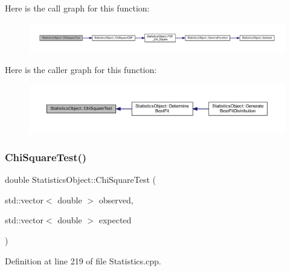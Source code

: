 Here is the call graph for this function\+:
\nopagebreak
\begin{figure}[H]
\begin{center}
\leavevmode
\includegraphics[width=350pt]{class_statistics_object_a5f516a6f544714694efc0ba0f925f38c_cgraph}
\end{center}
\end{figure}
Here is the caller graph for this function\+:
\nopagebreak
\begin{figure}[H]
\begin{center}
\leavevmode
\includegraphics[width=350pt]{class_statistics_object_a5f516a6f544714694efc0ba0f925f38c_icgraph}
\end{center}
\end{figure}
\mbox{\label{class_statistics_object_a6b3b58d412c68407195df629e2343c6d}} 
\subsubsection{\texorpdfstring{Chi\+Square\+Test()}{ChiSquareTest()}\hspace{0.1cm}{\footnotesize\ttfamily [2/2]}}
{\footnotesize\ttfamily double Statistics\+Object\+::\+Chi\+Square\+Test (\begin{DoxyParamCaption}\item[{std\+::vector$<$ double $>$}]{observed,  }\item[{std\+::vector$<$ double $>$}]{expected }\end{DoxyParamCaption})}



Definition at line 219 of file Statistics.\+cpp.

\mbox{\label{class_statistics_object_a7954e7f69391099bbc33c139149ebb15}} 
